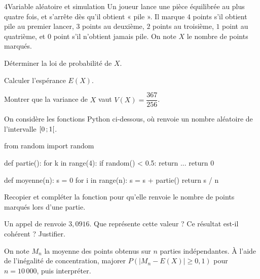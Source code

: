 

\begin{exoBac}{4}{Variable aléatoire et simulation}
Un joueur lance une pièce équilibrée au plus quatre fois, et s'arrête dès qu'il obtient « pile ». Il marque $4$ points s'il obtient
pile au premier lancer, $3$ points au deuxième, $2$ points au troisième, $1$ point au quatrième, et $0$ point s'il n'obtient jamais
pile. On note $X$ le nombre de points marqués.
\begin{questions}
  \item Déterminer la loi de probabilité de $X$.
  \item Calculer l'espérance $E(X)$.
  \item Montrer que la variance de $X$ vaut $V(X)=\dfrac{367}{256}$.
\end{questions}
On considère les fonctions Python ci-dessous, où  renvoie un nombre aléatoire de l'intervalle $\mathopen{[}0\,{;}\,1\mathclose{[}$.
\begin{codecote}[0.5]
\begin{pythoncol}
from random import random

def partie():
    for k in range(4):
        if random() < 0.5:
            return ...
    return 0
\end{pythoncol}
\cote
\begin{pythoncol}
def moyenne(n):
    s = 0
    for i in range(n):
        s = s + partie()
    return s / n
\end{pythoncol}
\end{codecote}
\begin{questions}[resume]
  \item Recopier et compléter la fonction  pour qu'elle renvoie le nombre de points marqués lors d'une partie.
  \item Un appel de  renvoie $3{,}0916$. Que représente cette valeur ? Ce résultat est-il cohérent ? Justifier.
  \item On note $M_n$ la moyenne des points obtenus sur $n$ parties indépendantes. À l'aide de l'inégalité de concentration, majorer
    $P\left(\left|M_n-E(X)\right|\geq0{,}1\right)$ pour $n=10\,000$, puis interpréter.
\end{questions}
\end{exoBac}

